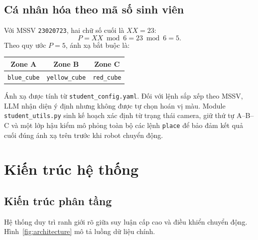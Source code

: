 \documentclass[a4paper,12pt]{article}
\newcommand{\code}[1]{\texttt{#1}}
\newcommand{\skill}[1]{\texttt{#1}}
\begin{document}
\subsection{Cá nhân hóa theo mã số sinh viên}
Với MSSV \code{23020723}, hai chữ số cuối là $XX=23$:
\begin{equation}
P = XX \bmod 6 = 23 \bmod 6 = 5.
\end{equation}
Theo quy ước $P=5$, ánh xạ bắt buộc là:
\begin{center}
\begin{tabular}{ccc}
\toprule
\textbf{Zone A} & \textbf{Zone B} & \textbf{Zone C}\\
\midrule
\code{blue\_cube} & \code{yellow\_cube} & \code{red\_cube}\\
\bottomrule
\end{tabular}
\end{center}
Ánh xạ được tính từ \code{student\_config.yaml}. Đối với lệnh sắp xếp theo
MSSV, LLM nhận diện ý định nhưng không được tự chọn hoán vị màu. Module
\code{student\_utils.py} sinh kế hoạch xác định từ trạng thái camera, giữ thứ tự
A--B--C và một lớp hậu kiểm mô phỏng toàn bộ các lệnh \skill{place} để bảo đảm
kết quả cuối đúng ánh xạ trên trước khi robot chuyển động.

\section{Kiến trúc hệ thống}

\subsection{Kiến trúc phân tầng}
Hệ thống duy trì ranh giới rõ giữa suy luận cấp cao và điều khiển chuyển động.
Hình~\ref{fig:architecture} mô tả luồng dữ liệu chính.
\end{document}
